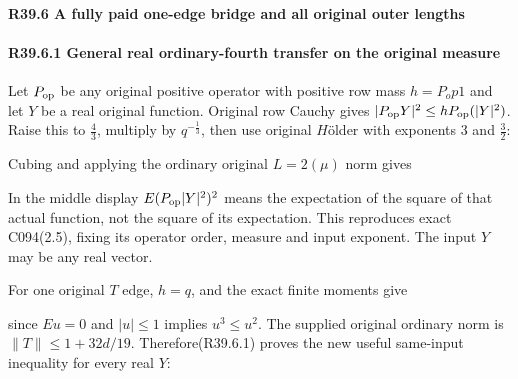 \paragraph{R39.6 A fully paid one-edge bridge and all original outer lengths}

\paragraph{R39.6.1 General real ordinary-fourth transfer on the original measure}

Let \(P_{\rm op}\) be any original positive operator with positive row mass \(h=P_op1\) and let \(Y\) be a real original function. Original row Cauchy gives \(\lvert P_{\rm op}Y\rvert ^2\le h P_{\rm op}(\lvert Y\rvert ^2)\). Raise this to \(\frac{4}{3}\), multiply by \(q^{-\frac{1}{3}}\), then use original \(H\)ölder with exponents 3 and \(\frac{3}{2}\):


Cubing and applying the ordinary original \(L=2(\mu)\) norm gives


In the middle display \(E(P_{\rm op}\lvert Y\rvert ^2)^2\) means the expectation of the square of that actual function, not the square of its expectation. This reproduces exact C094(2.5), fixing its operator order, measure and input exponent. The input \(Y\) may be any real vector.

For one original \(T\) edge, \(h=q\), and the exact finite moments give


since \(Eu=0\) and \(\lvert u\rvert \le 1\) implies \(u^3\le u^2\). The supplied original ordinary norm is \(\lVert T\rVert \le 1+32d/19\). Therefore(R39.6.1) proves the new useful same-input inequality for every real \(Y\):


